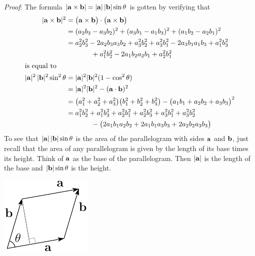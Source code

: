 \begin{enumerate}[(1)]
\textit{Proof}: 
The formula $|\mathbf{a}\times\mathbf{b}|=|\mathbf{a}|\,|\mathbf{b}|\sin\theta$ is gotten by verifying that
\begin{align*}
|\mathbf{a}\times\mathbf{b}|^2
&=\big(\mathbf{a}\times\mathbf{b}\big)\cdot\big(\mathbf{a}\times\mathbf{b}\big) \\
&=(a_2b_3-a_3b_2)^2+(a_3b_1-a_1b_3)^2+ (a_1b_2-a_2b_1)^2\\
&=a_2^2b_3^2-2a_2b_3a_3b_2+a_3^2b_2^2
+a_3^2b_1^2-2a_3b_1a_1b_3+a_1^2b_3^2\\&\hskip0.5in
+a_1^2b_2^2-2a_1b_2a_2b_1+a_2^2b_1^2\\
\intertext{is equal to}
|\mathbf{a}|^2\,|\mathbf{b}|^2\sin^2\theta
&=|\mathbf{a}|^2|\mathbf{b}|^2(1-\cos^2\theta)\\
&=|\mathbf{a}|^2|\mathbf{b}|^2-(\mathbf{a}\cdot\mathbf{b})^2 \\
&=\big(a_1^2+a_2^2+a_3^2\big)\big(b_1^2+b_2^2+b_3^2\big)
-\big(a_1b_1+a_2b_2+a_3b_3\big)^2\\
&=a_1^2b_2^2+a_1^2b_3^2+a_2^2b_1^2+a_2^2b_3^2+a_3^2b_1^2+a_3^2b_2^2\\
&\hskip0.5in
 -\big(2a_1b_1a_2b_2+2a_1b_1a_3b_3+2a_2b_2a_3b_3\big)\\
\end{align*}
To see that $|\mathbf{a}|\,|\mathbf{b}|\sin\theta$ is the area of the parallelogram
with sides $\mathbf{a}$ and $\mathbf{b}$, just recall that the area of any parallelogram
is given by the length of its base times its height. Think of $\mathbf{a}$ as the
base of the parallelogram. Then $|\mathbf{a}|$ is the length of the base
and $|\mathbf{b}|\sin\theta$ is the height.
      \begin{efig} 
      \begin{center}
      \includegraphics{areaB.pdf}
      \end{center}
      \end{efig}


\end{enumerate}

